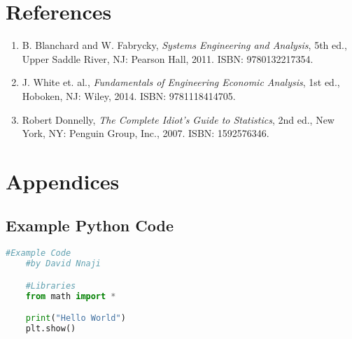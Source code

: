 \section*{References}
	\begin{enumerate}
		\item \label{Blanchard} B. Blanchard and W. Fabrycky, \textit{Systems Engineering and Analysis}, 5th ed., Upper Saddle River, NJ: Pearson Hall, 2011. ISBN: 9780132217354.
		\item \label{White} J. White et. al., \textit{Fundamentals of Engineering Economic Analysis}, 1st ed.,  Hoboken, NJ: Wiley, 2014. ISBN: 9781118414705.
		\item \label{Donnelly} Robert Donnelly, \textit{The Complete Idiot's Guide to Statistics}, 2nd ed., New York, NY: Penguin Group, Inc., 2007. ISBN: 1592576346.
	\end{enumerate}

\section*{Appendices}
	\subsection*{Example Python Code}
	\begin{lstlisting}[language=Python,caption=Example Code]
	#Example Code
	#by David Nnaji

	#Libraries
	from math import *

	print("Hello World")
	plt.show()\end{lstlisting}
